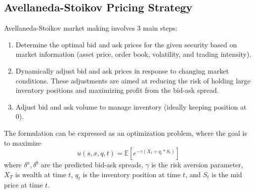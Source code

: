 \documentclass[letterpaper, 10 pt, conference]{ieeeconf}  %
\begin{document}
\subsection{Avellaneda-Stoikov Pricing Strategy}
Avellaneda-Stoikov market making involves 3 main steps:
\begin{enumerate}
        \item Determine the optimal bid and ask prices for the given security based on market information (asset price, order book, volatility, and trading intensity).
        \item Dynamically adjust bid and ask prices in response to changing market conditions. These adjustments are aimed at reducing the risk of holding large inventory positions and maximizing profit from the bid-ask spread.
        \item Adjust bid and ask volume to manage inventory (ideally keeping position at 0).
\end{enumerate}

The formulation can be expressed as an optimization problem, where the goal is to maximize $$u(s,x,q,t) = \mathbb{E} \left[e^{-\gamma(X_t+q_t*S_t)} \right]$$
where $\delta^a, \delta^b$ are the predicted bid-ask spreads, $\gamma$ is the risk aversion parameter, $X_T$ is wealth at time $t$, $q_t$ is the inventory position at time $t$, and $S_t$ is the mid price at time $t$. 
\end{document}
